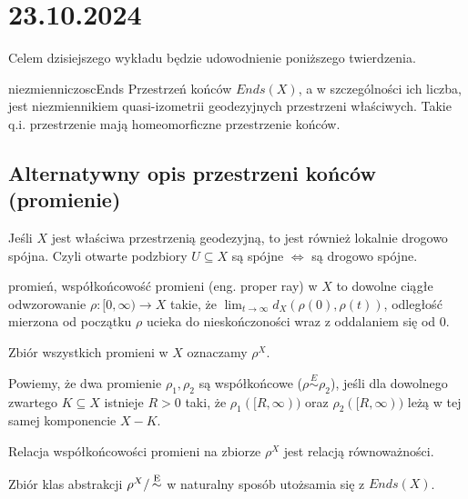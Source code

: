 \section{23.10.2024}{}

Celem dzisiejszego wykładu będzie udowodnienie poniższego twierdzenia.

\begin{theorem}{}{niezmienniczoscEnds} 
  Przestrzeń końców $Ends(X)$, a w szczególności ich liczba, jest niezmiennikiem quasi-izometrii geodezyjnych przestrzeni właściwych. Takie q.i. przestrzenie mają homeomorficzne przestrzenie końców.
\end{theorem}

\subsection{Alternatywny opis przestrzeni końców (promienie)}

Jeśli $X$ jest właściwa przestrzenią geodezyjną, to jest również lokalnie drogowo spójna. Czyli otwarte podzbiory $U\subseteq X$ są spójne $\iff$ są drogowo spójne.

\begin{definition}{promień, współkońcowość promieni}{}
   (eng. proper ray) w $X$ to dowolne ciągłe odwzorowanie $\rho:[0,\infty)\to X$ takie, że $\lim_{t\to\infty}d_X(\rho(0), \rho(t))$, odległość mierzona od początku $\rho$ ucieka do nieskończoności wraz z oddalaniem się od $0$.

  Zbiór wszystkich promieni w $X$ oznaczamy $\rho^X$.

  Powiemy, że dwa promienie $\rho_1,\rho_2$ są współkońcowe ($\rho\overset{E}{\sim}\rho_2$), jeśli dla dowolnego zwartego $K\subseteq X$ istnieje $R>0$ taki, że $\rho_1([R, \infty))$ oraz $\rho_2([R, \infty))$ leżą w tej samej komponencie $X-K$.
\end{definition}

Relacja współkońcowości promieni na zbiorze $\rho^X$ jest relacją równoważności.

\begin{fact}{}{}
  Zbiór klas abstrakcji $\rho^X/\operatorname{\overset{E}{\sim}}$ w naturalny sposób utożsamia się z $Ends(X)$.
\end{fact}

